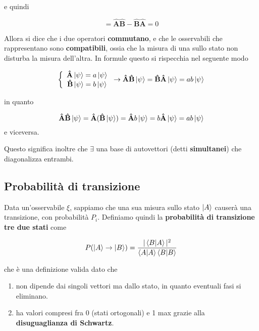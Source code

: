 e quindi 

\begin{equation}
[\mathbf{\hat A},\mathbf{\hat B}]= \mathbf{\hat A}\mathbf{\hat B} - \mathbf{\hat B}\mathbf{\hat A}=0 
\end{equation}


Allora si dice che i due operatori \textbf{commutano}, e che le osservabili che rappresentano sono \textbf{compatibili}, ossia che la misura di una sullo stato non disturba la misura dell'altra. 
In formule questo si rispecchia nel seguente modo

\begin{equation}
\left\{\begin{array}{ccc}

\mathbf{\hat A} \ket{\psi}= a\ket{\psi} \\ \mathbf{\hat B} \ket{\psi}= b\ket{\psi} \end{array}\right. \rightarrow \mathbf{\hat A}\mathbf{\hat B}\ket{\psi}=\mathbf{\hat B}\mathbf{\hat A}\ket{\psi}=ab\ket{\psi}
\end{equation}

in quanto

\begin{equation}
\mathbf{\hat A}\mathbf{\hat B}\ket{\psi}= \mathbf{\hat A}(\mathbf{\hat B}\ket{\psi})=\mathbf{\hat A}b\ket{\psi}=b\mathbf{\hat A}\ket{\psi}= ab\ket{\psi}
\end{equation}
 e viceversa. 
 
 Questo significa inoltre che $\exists$ una base di autovettori (detti \textbf{simultanei}) che diagonalizza entrambi.

\subsection{Probabilità di transizione} 

Data un'osservabile $\xi$, sappiamo che una sua misura sullo stato $\ket{A}$ causerà una transizione, con probabilità $P_i$. Definiamo quindi la \textbf{probabilità di transizione tre due stati} come

\begin{align}
P(\ket{A} \rightarrow \ket{B})= \frac{|\braket{B|A}|^2}{\braket{A|A}\braket{B|B}}
\end{align}

che è una definizione valida dato che

\begin{enumerate}
	\item non dipende dai singoli vettori ma dallo stato, in quanto eventuali fasi si eliminano.
	\item ha valori compresi fra 0 (stati ortogonali) e 1 max grazie alla \textbf{disuguaglianza di Schwartz}.
\end{enumerate}

